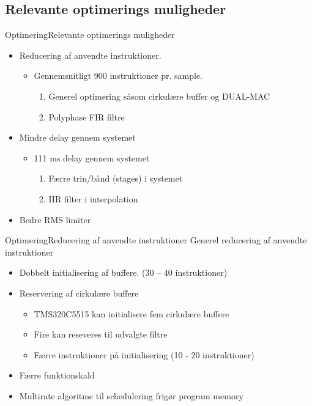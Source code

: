
%

\subsection{Relevante optimerings muligheder}
\begin{frame}{Optimering}{Relevante optimerings muligheder}
	\begin{itemize}
\item Reducering af anvendte instruktioner.
\begin{itemize}
	\item Gennemsnitligt 900 instruktioner pr. sample.
	\begin{enumerate}
		\item Generel optimering såsom cirkulære buffer og DUAL-MAC
		\item Polyphase FIR filtre
	\end{enumerate}
\end{itemize}

\item Mindre delay gennem systemet
\begin{itemize}
	\item 111 ms delay gennem systemet
	\begin{enumerate}
		\item Færre trin/bånd (stages) i systemet
		\item IIR filter i interpolation
	\end{enumerate}
\end{itemize}
\item Bedre RMS limiter 
	\end{itemize}
\end{frame}

\begin{frame}{Optimering}{Reducering af anvendte instruktioner}
Generel reducering af anvendte instruktioner
\begin{itemize}
\item Dobbelt initialisering af buffere. (30 – 40 instruktioner) 
\item Reservering af cirkulære buffere
\begin{itemize}
\item TMS320C5515 kan initialisere fem cirkulære buffere
\item Fire kan reseveres til udvalgte filtre
\item Færre instruktioner på initialisering (10 - 20 instruktioner)
\end{itemize}
\item Færre funktionskald
\item Multirate algoritme til schedulering frigør program memory
\end{itemize}
\end{frame}


